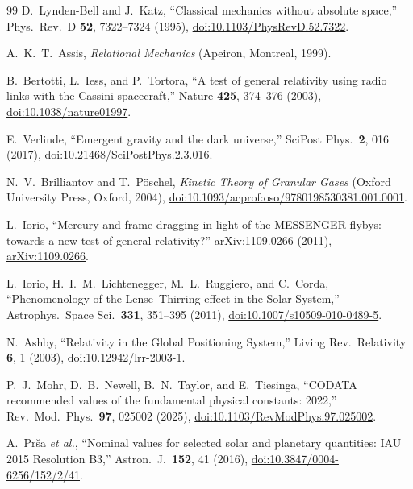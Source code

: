 \documentclass[aps,reprint,amsmath,amssymb,nofootinbib,superscriptaddress,floatfix]{revtex4-2}
\begin{document}
\begin{thebibliography}{99}
D.~Lynden-Bell and J.~Katz, ``Classical mechanics without absolute
space,'' Phys.\ Rev.\ D \textbf{52}, 7322--7324 (1995),
\href{https://doi.org/10.1103/PhysRevD.52.7322}
{doi:10.1103/PhysRevD.52.7322}.

A.~K.~T.~Assis, \emph{Relational Mechanics}
(Apeiron, Montreal, 1999).

B.~Bertotti, L.~Iess, and P.~Tortora, ``A test of general relativity
using radio links with the Cassini spacecraft,''
Nature \textbf{425}, 374--376 (2003),
\href{https://doi.org/10.1038/nature01997}{doi:10.1038/nature01997}.

E.~Verlinde, ``Emergent gravity and the dark universe,''
SciPost Phys.\ \textbf{2}, 016 (2017),
\href{https://doi.org/10.21468/SciPostPhys.2.3.016}
{doi:10.21468/SciPostPhys.2.3.016}.

N.~V.~Brilliantov and T.~P\"oschel,
\emph{Kinetic Theory of Granular Gases}
(Oxford University Press, Oxford, 2004),
\href{https://doi.org/10.1093/acprof:oso/9780198530381.001.0001}
{doi:10.1093/acprof:oso/9780198530381.001.0001}.

L.~Iorio, ``Mercury and frame-dragging in light of the MESSENGER
flybys: towards a new test of general relativity?''
arXiv:1109.0266 (2011),
\href{https://arxiv.org/abs/1109.0266}{arXiv:1109.0266}.

L.~Iorio, H.~I.~M.~Lichtenegger, M.~L.~Ruggiero, and C.~Corda,
``Phenomenology of the Lense--Thirring effect in the Solar System,''
Astrophys.\ Space Sci.\ \textbf{331}, 351--395 (2011),
\href{https://doi.org/10.1007/s10509-010-0489-5}
{doi:10.1007/s10509-010-0489-5}.

N.~Ashby, ``Relativity in the Global Positioning System,''
Living Rev.\ Relativity \textbf{6}, 1 (2003),
\href{https://doi.org/10.12942/lrr-2003-1}{doi:10.12942/lrr-2003-1}.

P.~J.~Mohr, D.~B.~Newell, B.~N.~Taylor, and E.~Tiesinga,
``CODATA recommended values of the fundamental physical constants:
2022,'' Rev.\ Mod.\ Phys.\ \textbf{97}, 025002 (2025),
\href{https://doi.org/10.1103/RevModPhys.97.025002}
{doi:10.1103/RevModPhys.97.025002}.

A.~Pr\v{s}a \emph{et al.}, ``Nominal values for selected solar and
planetary quantities: IAU 2015 Resolution B3,''
Astron.\ J.\ \textbf{152}, 41 (2016),
\href{https://doi.org/10.3847/0004-6256/152/2/41}
{doi:10.3847/0004-6256/152/2/41}.

\end{thebibliography}
\end{document}
